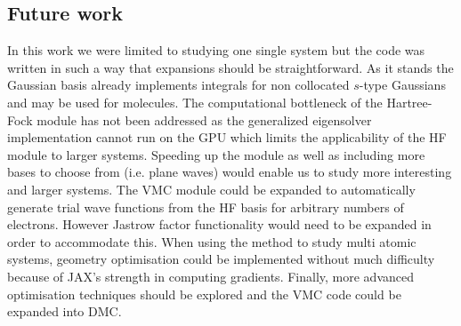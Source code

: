 \documentclass[final,3p,times,twocolumn]{elsarticle}
\begin{document}
	\subsection{Future work}
	In this work we were limited to studying one single system but the code was written in such a way that expansions should be straightforward. As it stands the Gaussian basis already implements integrals for non collocated $s$-type Gaussians and may be used for molecules. The computational bottleneck of the Hartree-Fock module has not been addressed as the generalized eigensolver implementation cannot run on the GPU which limits the applicability of the HF module to larger systems. Speeding up the module as well as including more bases to choose from (i.e. plane waves) would enable us to study more interesting and larger systems. 
	The VMC module could be expanded to automatically generate trial wave functions from the HF basis for arbitrary numbers of electrons. However Jastrow factor functionality would need to be expanded in order to accommodate this. When using the method to study multi atomic systems, geometry optimisation could be implemented without much difficulty because of JAX's strength in computing gradients. Finally, more advanced optimisation techniques should be explored and the VMC code could be expanded into DMC.
	
	\newpage
	
	
	
	\appendix
\end{document}
